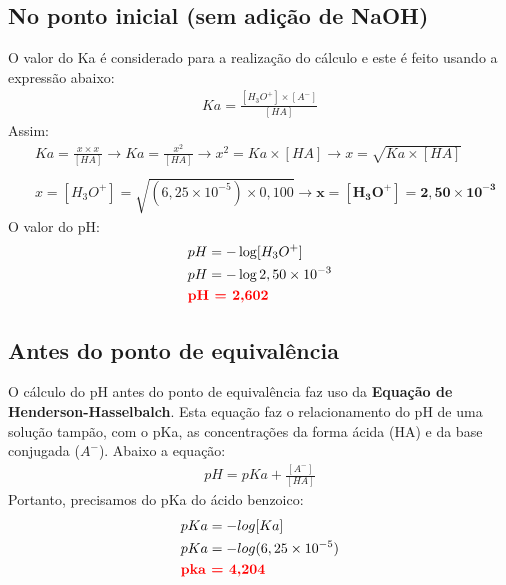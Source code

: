 \documentclass[a4paper, 12pt]{article}
\begin{document}
\subsection{No ponto inicial (sem adição de NaOH)}
O valor do Ka é considerado para a realização do cálculo e este é feito usando a expressão abaixo:
\begin{align*}
	Ka = \frac{[H_{3}O^{+}] \times [A^{-}]}{[HA]}
\end{align*}
Assim:
\begin{align*}
	& Ka = \frac{x \times x}{[HA]} \longrightarrow	Ka = \frac{x^{2}}{[HA]} \rightarrow x^{2} = Ka \times [HA] \longrightarrow	x = \sqrt{Ka \times [HA]} \\ \\
	& x = [H_{3}O^{+}] = \sqrt{(6,25 \times 10^{-5}) \times 0,100} \longrightarrow	\mathbf{x = [H_{3}O^{+}] = 2,50 \times 10^{-3}}
\end{align*}
O valor do pH:
\begin{align*}
	& pH = - \log [H_{3}O^{+}] \\
	& pH = - \log {2,50 \times 10^{-3}} \\
	& \textbf{\textcolor{red}{pH = 2,602}}
\end{align*}

\subsection{Antes do ponto de equivalência}
O cálculo do pH antes do ponto de equivalência faz uso da \textbf{Equação de Henderson-Hasselbalch}. Esta equação faz o relacionamento do pH de uma solução tampão, com o pKa, as concentrações da forma ácida (HA) e da base conjugada ($A^{-}$). Abaixo a equação:
\begin{align*}
	pH = pKa + \frac{[A^{-}]}{[HA]}
\end{align*}
Portanto, precisamos do pKa do ácido benzoico:
\begin{align*}
	& pKa = -log [Ka] \\
	& pKa = -log (6,25 \times 10^{-5}) \\
	& \textbf{\textcolor{red}{pka = 4,204}}
\end{align*}
\end{document}

